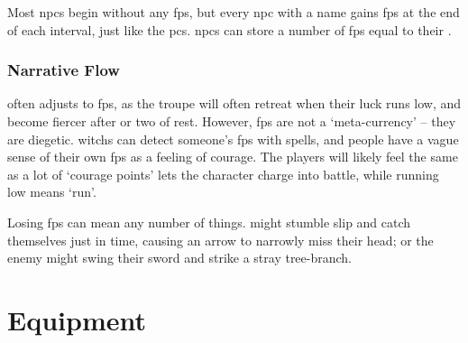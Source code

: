 \begin{multicols}{2}
Most \glspl{npc} begin without any \glspl{fp}, but every \gls{npc} with a name gains \glspl{fp} at the end of each \gls{interval}, just like the \glspl{pc}.
\Glspl{npc} can store a number of \glspl{fp} equal to their .

\subsubsection{Narrative Flow}
often adjusts to \glspl{fp}, as the troupe will often retreat when their luck runs low, and become fiercer after  or two of rest.
However, \glspl{fp} are not a `meta-currency' -- they are diegetic.
\Glspl{witch} can detect someone's \glspl{fp} with \glspl{spell}, and people have a vague sense of their own \glspl{fp} as a feeling of courage.
The players will likely feel the same as a lot of `courage points' lets the character charge into battle, while running low means `run'.

Losing \glspl{fp} can mean any number of things.
 might stumble slip and catch themselves just in time, causing an arrow to narrowly miss their head; or the enemy might swing their sword and strike a stray tree-branch.

\end{multicols}

\section{Equipment}

